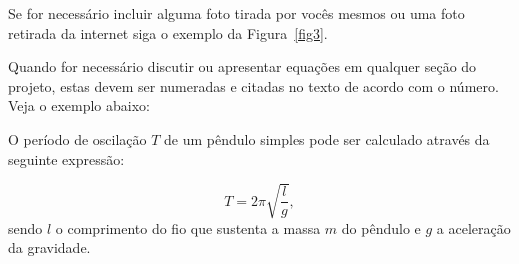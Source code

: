 \documentclass[12pt,oneside,brazil,hidelinks,article,sumario=tradicional,a4paper]{abntex2}
\begin{document}




Se for necessário incluir alguma foto tirada por vocês mesmos ou uma foto retirada da internet siga o exemplo da Figura~\ref{fig3}.

Quando for necessário discutir ou apresentar equações em qualquer seção do projeto, estas devem ser numeradas e citadas no texto de acordo com o número. Veja o exemplo abaixo:

O período de oscilação \(T\) de um pêndulo simples pode ser calculado através da seguinte expressão:

\begin{equation}\label{periodo}
    T = 2 \pi \sqrt{\dfrac{l}{g}},
\end{equation}
sendo $l$ o comprimento do fio que sustenta a massa $m$ do pêndulo e $g$ a aceleração da gravidade.
\end{document}
